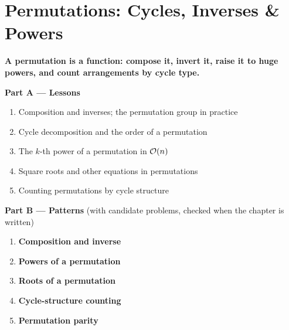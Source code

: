 \chapter{Permutations: Cycles, Inverses \& Powers}
\label{ch:permutations}

\begin{tcolorbox}[enhanced, colback=white, colframe=secondaryblue, boxrule=1pt, arc=2mm]
\textbf{\large\textcolor{primaryblue}{A permutation is a function: compose it, invert it, raise it to huge powers, and count arrangements by cycle type.}}
\end{tcolorbox}


\begin{plannedbox}
\textbf{Part A --- Lessons}
\begin{enumerate}[leftmargin=*, label=\textbf{A\arabic*.}, itemsep=1pt]
    \item Composition and inverses; the permutation group in practice
    \item Cycle decomposition and the order of a permutation
    \item The $k$-th power of a permutation in $\mathcal{O}(n)$
    \item Square roots and other equations in permutations
    \item Counting permutations by cycle structure
\end{enumerate}
\textbf{Part B --- Patterns} (with candidate problems, checked when the chapter is written)
\begin{enumerate}[leftmargin=*, label=\textbf{P\arabic*.}, itemsep=1pt]
    \item \textbf{Composition and inverse}
    \item \textbf{Powers of a permutation}
    \item \textbf{Roots of a permutation}
    \item \textbf{Cycle-structure counting}
    \item \textbf{Permutation parity}
\end{enumerate}
\end{plannedbox}
